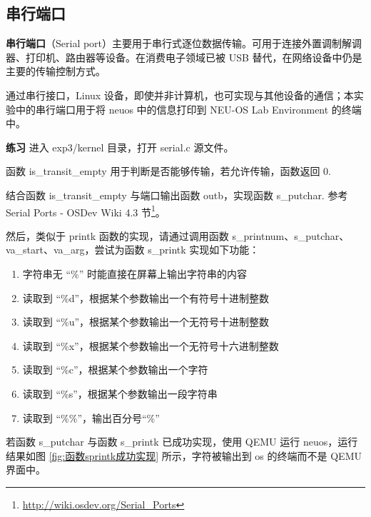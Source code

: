 \subsection{串行端口}

\textbf{串行端口}（Serial port）主要用于串行式逐位数据传输。可用于连接外置调制解调器、打印机、路由器等设备。在消费电子领域已被 USB 替代，在网络设备中仍是主要的传输控制方式。

通过串行接口，Linux 设备，即使并非计算机，也可实现与其他设备的通信；本实验中的串行端口用于将 neuos 中的信息打印到 NEU-OS Lab Environment 的终端中。

\begin{mdframed}[hidealllines=true,backgroundcolor=gray!20]
\textbf{练习 }进入 exp3/kernel 目录，打开 serial.c 源文件。

函数 is\_transit\_empty 用于判断是否能够传输，若允许传输，函数返回 0.

结合函数 is\_transit\_empty 与端口输出函数 outb，实现函数 s\_putchar. 参考 Serial Ports - OSDev Wiki 4.3 节\footnote{\url{http://wiki.osdev.org/Serial_Ports}}。

然后，类似于 printk 函数的实现，请通过调用函数 s\_printnum、s\_putchar、va\_start、va\_arg，尝试为函数 s\_printk 实现如下功能：

\begin{enumerate}
    \item 字符串无 “\%” 时能直接在屏幕上输出字符串的内容
    \item 读取到 “\%d”，根据某个参数输出一个有符号十进制整数
    \item 读取到 “\%u”，根据某个参数输出一个无符号十进制整数
    \item 读取到 “\%x”，根据某个参数输出一个无符号十六进制整数
    \item 读取到 “\%c”，根据某个参数输出一个字符
    \item 读取到 “\%s”，根据某个参数输出一段字符串
    \item 读取到 “\%\%”，输出百分号“\%”
\end{enumerate}

若函数 s\_putchar 与函数 s\_printk 已成功实现，使用 QEMU 运行 neuos，运行结果如图 \ref{fig:函数sprintk成功实现} 所示，字符被输出到 os 的终端而不是 QEMU 界面中。

\end{mdframed}

